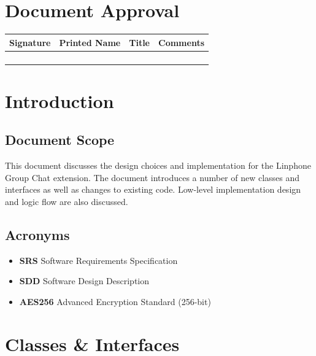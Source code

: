 \documentclass[11pt]{article}
\begin{document}
\section{Document Approval}
\begin{table}[h]
\begin{tabular}{llll}
\textbf{Signature}     & \textbf{Printed Name} & \textbf{Title}        & \textbf{Comments}     \\ \hline
\multicolumn{1}{|l|}{} & \multicolumn{1}{L{3.5cm}|}{} & \multicolumn{1}{L{3.5cm}|}{} & \multicolumn{1}{L{4cm}|}{} \\ \hline
\multicolumn{1}{|l|}{} & \multicolumn{1}{l|}{} & \multicolumn{1}{l|}{} & \multicolumn{1}{l|}{} \\ \hline
\multicolumn{1}{|l|}{} & \multicolumn{1}{l|}{} & \multicolumn{1}{l|}{} & \multicolumn{1}{l|}{} \\ \hline
\multicolumn{1}{|l|}{} & \multicolumn{1}{l|}{} & \multicolumn{1}{l|}{} & \multicolumn{1}{l|}{} \\ \hline
\end{tabular}
\end{table}

\newpage
\section{Introduction}
\subsection{Document Scope}
This document discusses the design choices and implementation for the Linphone Group Chat extension. The document introduces a number of new classes and interfaces as well as changes to existing code. Low-level implementation design and logic flow are also discussed.
\subsection{Acronyms}
\begin{itemize}
\item \textbf{SRS} Software Requirements Specification
\item \textbf{SDD} Software Design Description
\item \textbf{AES256} Advanced Encryption Standard (256-bit)
\end{itemize}
\section{Classes \& Interfaces}
\end{document}
